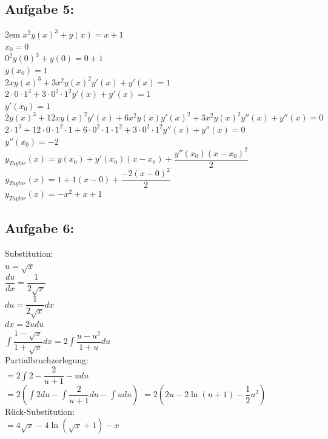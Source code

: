 \documentclass[11pt,final]{scrreprt}
\newcommand{\br} {\medskip\\}
\begin{document}
\subsection*{Aufgabe 5:}
\begingroup
\leftskip2em 
$ x^2y(x)^3+y(x)=x+1 $\\
$ x_0=0$\br
$ 0^2y(0)^3+y(0)=0+1 $\\
$ y(x_0) = 1$\br
$ 2xy(x)^3+3x^2y(x)^2y'(x)+y'(x)=1 $\br
$ 2\cdot0\cdot1^3+3\cdot0^2\cdot1^2y'(x)+y'(x)=1 $\\
$ y'(x_0) = 1$\br
$ 2y(x)^3 + 12xy(x)^2y'(x)+6x^2y(x)y'(x)^2+3x^2y(x)^2y''(x)+y''(x) = 0 $\br
$ 2\cdot1^3 + 12\cdot0\cdot1^2\cdot1+6\cdot0^2\cdot1\cdot1^2+3\cdot0^2\cdot1^2y''(x)+y''(x) = 0 $\\
$ y''(x_0) = -2 $\br
$ y_{Taylor}(x) = y(x_0)+y'(x_0)(x-x_0)+\dfrac{y''(x_0)(x-x_0)^2}{2} $\\
$ y_{Taylor}(x) = 1+1(x-0)+\dfrac{-2(x-0)^2}{2} $\\
$ y_{Taylor}(x) = -x^2+x+1$\\
\par	
\endgroup

\subsection*{Aufgabe 6:}
\hspace*{2em}Substitution:\\
\hspace*{4em}$u=\sqrt{x}$\\
\hspace*{4em}$\dfrac{du}{dx} = \dfrac{1}{2\sqrt{x}}$\\
\hspace*{4em}$du = \dfrac{1}{2\sqrt{x}} dx$\\
\hspace*{4em}$dx = 2udu$\br
\hspace*{2em}$\int\dfrac{1-\sqrt{x}}{1+\sqrt{x}} dx = 2\int\dfrac{u-u^2}{1+u} du$\\
\hspace*{2em}Partialbruchzerlegung:\\
\hspace*{4em}$= 2\int2-\dfrac{2}{u+1}-u du $\\
\hspace*{4em}$= 2(\int 2 du - \int\dfrac{2}{u+1} du - \int u du) $
\hspace*{4em}$= 2(2u - 2\ln(u+1) - \dfrac{1}{2}u^2) $\\
\hspace*{2em}Rück-Substitution:\\
\hspace*{4em}$= 4\sqrt{x} - 4\ln(\sqrt{x}+1) - x $
\end{document}

